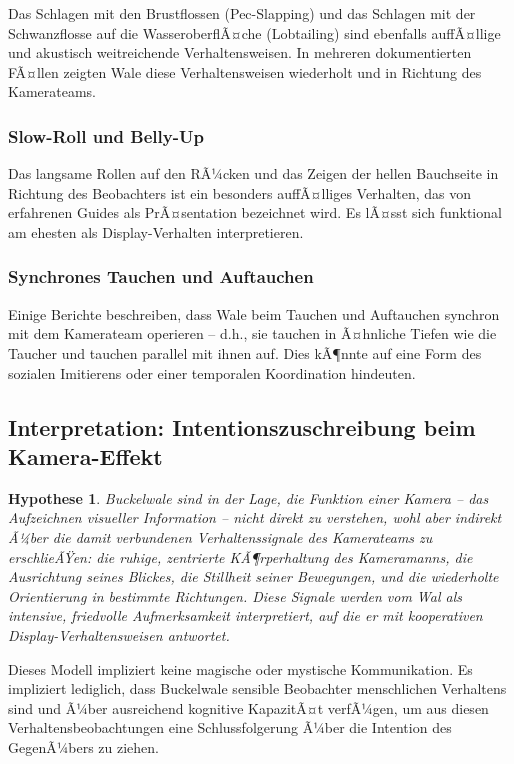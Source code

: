 ﻿\documentclass[12pt,a4paper]{article}
\newtheorem{hypothese}{Hypothese}[section]
\theoremstyle{definition}
\theoremstyle{remark}
\begin{document}
Das Schlagen mit den Brustflossen (Pec-Slapping) und das Schlagen mit der
Schwanzflosse auf die WasseroberflÃ¤che (Lobtailing) sind ebenfalls
auffÃ¤llige und akustisch weitreichende Verhaltensweisen. In mehreren
dokumentierten FÃ¤llen zeigten Wale diese Verhaltensweisen wiederholt und
in Richtung des Kamerateams.

\subsubsection{Slow-Roll und Belly-Up}

Das langsame Rollen auf den RÃ¼cken und das Zeigen der hellen Bauchseite in
Richtung des Beobachters ist ein besonders auffÃ¤lliges Verhalten, das
von erfahrenen Guides als PrÃ¤sentation bezeichnet wird. Es lÃ¤sst sich
funktional am ehesten als Display-Verhalten interpretieren.

\subsubsection{Synchrones Tauchen und Auftauchen}

Einige Berichte beschreiben, dass Wale beim Tauchen und Auftauchen synchron
mit dem Kamerateam operieren -- d.h., sie tauchen in Ã¤hnliche Tiefen wie die
Taucher und tauchen parallel mit ihnen auf. Dies kÃ¶nnte auf eine Form des
sozialen Imitierens oder einer temporalen Koordination hindeuten.

\subsection{Interpretation: Intentionszuschreibung beim Kamera-Effekt}

\begin{hypothese}
  \label{hyp:kamera}
  Buckelwale sind in der Lage, die Funktion einer Kamera -- das Aufzeichnen
  visueller Information -- nicht direkt zu verstehen, wohl aber indirekt
  Ã¼ber die damit verbundenen Verhaltenssignale des Kamerateams zu erschlieÃŸen:
  die ruhige, zentrierte KÃ¶rperhaltung des Kameramanns, die Ausrichtung seines
  Blickes, die Stillheit seiner Bewegungen, und die wiederholte Orientierung
  in bestimmte Richtungen. Diese Signale werden vom Wal als
  intensive, friedvolle Aufmerksamkeit interpretiert, auf die er mit
  kooperativen Display-Verhaltensweisen antwortet.
\end{hypothese}

Dieses Modell impliziert keine magische oder mystische Kommunikation. Es
impliziert lediglich, dass Buckelwale sensible Beobachter menschlichen
Verhaltens sind und Ã¼ber ausreichend kognitive KapazitÃ¤t verfÃ¼gen, um aus
diesen Verhaltensbeobachtungen eine Schlussfolgerung Ã¼ber die Intention
des GegenÃ¼bers zu ziehen.
\end{document}
